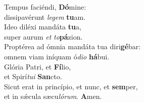\evenverse Tempus faciéndi, \textbf{Dó}mine:~\*\\
\evenverse dissipavérunt \textit{le}\textit{gem} \textbf{tu}am.\\
\oddverse Ideo diléxi mandáta \textbf{tu}a,~\*\\
\oddverse super aurum \textit{et} \textit{to}\textbf{pá}zion.\\
\evenverse Proptérea ad ómnia mandáta tua diri\textbf{gé}bar:~\*\\
\evenverse omnem viam iníquam ó\textit{di}\textit{o} \textbf{há}bui.\\
\oddverse Glória Patri, et \textbf{Fí}lio,~\*\\
\oddverse et Spirí\textit{tu}\textit{i} \textbf{San}cto.\\
\evenverse Sicut erat in princípio, et nunc, et \textbf{sem}per,~\*\\
\evenverse et in sǽcula sæcu\textit{ló}\textit{rum}. \textbf{A}men.\\
